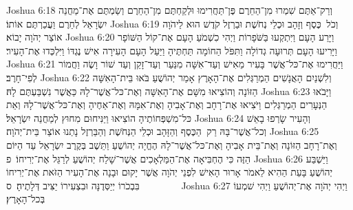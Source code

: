 Joshua 6:18	וְרַק־אַתֶּם שִׁמְרוּ מִן־הַחֵרֶם פֶּן־תַּחֲרִימוּ וּלְקַחְתֶּם מִן־הַחֵרֶם וְשַׂמְתֶּם אֶת־מַחֲנֵה יִשְׂרָאֵל לְחֵרֶם וַעֲכַרְתֶּם אוֹתוֹ׃
Joshua 6:19	וְכֹל  כֶּסֶף וְזָהָב וּכְלֵי נְחֹשֶׁת וּבַרְזֶל קֹדֶשׁ הוּא לַיהֹוָה אוֹצַר יְהֹוָה יָבוֹא׃
Joshua 6:20	וַיָּרַע הָעָם וַיִּתְקְעוּ בַּשֹּׁפָרוֹת וַיְהִי כִשְׁמֹעַ הָעָם אֶת־קוֹל הַשּׁוֹפָר וַיָּרִיעוּ הָעָם תְּרוּעָה גְדוֹלָה וַתִּפֹּל הַחוֹמָה תַּחְתֶּיהָ וַיַּעַל הָעָם הָעִירָה אִישׁ נֶגְדּוֹ וַיִּלְכְּדוּ אֶת־הָעִיר׃
Joshua 6:21	וַיַּחֲרִימוּ אֶת־כּל־אֲשֶׁר בָּעִיר מֵאִישׁ וְעַד־אִשָּׁה מִנַּעַר וְעַד־זָקֵן וְעַד שׁוֹר וָשֶׂה וַחֲמוֹר לְפִי־חָרֶב׃
Joshua 6:22	וְלִשְׁנַיִם הָאֲנָשִׁים הַמְרַגְּלִים אֶת־הָאָרֶץ אָמַר יְהוֹשֻׁעַ בֹּאוּ בֵּית־הָאִשָּׁה הַזּוֹנָה וְהוֹצִיאוּ מִשָּׁם אֶת־הָאִשָּׁה וְאֶת־כּל־אֲשֶׁר־לָהּ כַּאֲשֶׁר נִשְׁבַּעְתֶּם לָהּ׃
Joshua 6:23	וַיָּבֹאוּ הַנְּעָרִים הַמְרַגְּלִים וַיֹּצִיאוּ אֶת־רָחָב וְאֶת־אָבִיהָ וְאֶת־אִמָּהּ וְאֶת־אַחֶיהָ וְאֶת־כּל־אֲשֶׁר־לָהּ וְאֵת כּל־מִשְׁפְּחוֹתֶיהָ הוֹצִיאוּ וַיַּנִּיחוּם מִחוּץ לְמַחֲנֵה יִשְׂרָאֵל׃
Joshua 6:24	וְהָעִיר שָׂרְפוּ בָאֵשׁ וְכל־אֲשֶׁר־בָּהּ רַק  הַכֶּסֶף וְהַזָּהָב וּכְלֵי הַנְּחֹשֶׁת וְהַבַּרְזֶל נָתְנוּ אוֹצַר בֵּית־יְהֹוָה׃
Joshua 6:25	וְאֶת־רָחָב הַזּוֹנָה וְאֶת־בֵּית אָבִיהָ וְאֶת־כּל־אֲשֶׁר־לָהּ הֶחֱיָה יְהוֹשֻׁעַ וַתֵּשֶׁב בְּקֶרֶב יִשְׂרָאֵל עַד הַיּוֹם הַזֶּה כִּי הֶחְבִּיאָה אֶת־הַמַּלְאָכִים אֲשֶׁר־שָׁלַח יְהוֹשֻׁעַ לְרַגֵּל אֶת־יְרִיחוֹ׃ {פ}
Joshua 6:26	וַיַּשְׁבַּע יְהוֹשֻׁעַ בָּעֵת הַהִיא לֵאמֹר אָרוּר הָאִישׁ לִפְנֵי יְהֹוָה אֲשֶׁר יָקוּם וּבָנָה אֶת־הָעִיר הַזֹּאת אֶת־יְרִיחוֹ בִּבְכֹרוֹ יְיַסְּדֶנָּה וּבִצְעִירוֹ יַצִּיב דְּלָתֶיהָ׃ {ס}        
Joshua 6:27	וַיְהִי יְהֹוָה אֶת־יְהוֹשֻׁעַ וַיְהִי שׁמְעוֹ בְּכל־הָאָרֶץ׃

